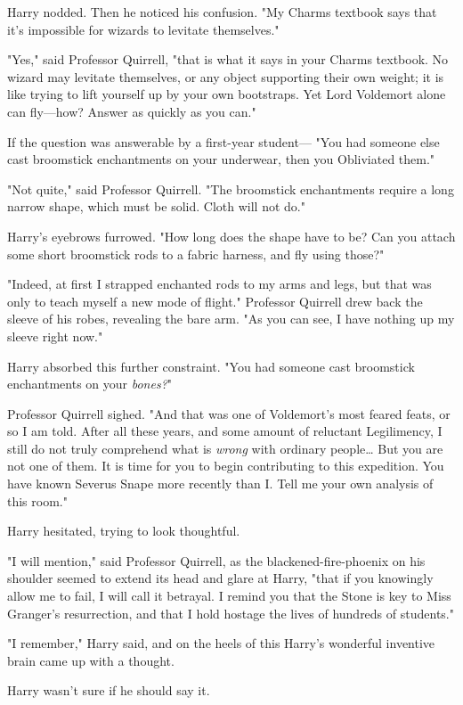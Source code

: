 Harry nodded. Then he noticed his confusion. "My Charms textbook says that it's
impossible for wizards to levitate themselves."

"Yes," said Professor Quirrell, "that is what it says in your Charms textbook.
No wizard may levitate themselves, or any object supporting their own weight;
it is like trying to lift yourself up by your own bootstraps. Yet Lord
Voldemort alone can fly---how? Answer as quickly as you can."

If the question was answerable by a first-year student--- "You had someone else
cast broomstick enchantments on your underwear, then you Obliviated them."

"Not quite," said Professor Quirrell. "The broomstick enchantments require a
long narrow shape, which must be solid. Cloth will not do."

Harry's eyebrows furrowed. "How long does the shape have to be? Can you attach
some short broomstick rods to a fabric harness, and fly using those?"

"Indeed, at first I strapped enchanted rods to my arms and legs, but that was
only to teach myself a new mode of flight." Professor Quirrell drew back the
sleeve of his robes, revealing the bare arm. "As you can see, I have nothing up
my sleeve right now."

Harry absorbed this further constraint. "You had someone cast broomstick
enchantments on your \emph{bones?}"

Professor Quirrell sighed. "And that was one of Voldemort's most feared feats,
or so I am told. After all these years, and some amount of reluctant
Legilimency, I still do not truly comprehend what is \emph{wrong} with ordinary
people{\ldots} But you are not one of them. It is time for you to begin
contributing to this expedition. You have known Severus Snape more recently
than I\@. Tell me your own analysis of this room."

Harry hesitated, trying to look thoughtful.

"I will mention," said Professor Quirrell, as the blackened-fire-phoenix on his
shoulder seemed to extend its head and glare at Harry, "that if you knowingly
allow me to fail, I will call it betrayal. I remind you that the Stone is key
to Miss Granger's resurrection, and that I hold hostage the lives of hundreds
of students."

"I remember," Harry said, and on the heels of this Harry's wonderful inventive
brain came up with a thought.

Harry wasn't sure if he should say it.


